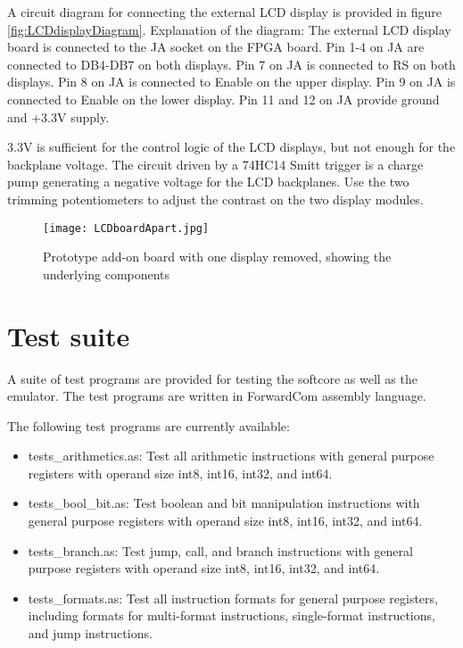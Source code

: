 \documentclass[11pt,a4paper,oneside,openright]{report}
\newcommand{\vv}{ \vspace{2mm} }   %
\begin{document}
A circuit diagram for connecting the external LCD display is provided in figure \ref{fig:LCDdisplayDiagram}. Explanation of the diagram: The external LCD display board is connected to the JA socket on the FPGA board. Pin 1-4 on JA are connected to DB4-DB7 on both displays. Pin 7 on JA is connected to RS on both displays. Pin 8 on JA is connected to Enable on the upper display. Pin 9 on JA is connected to Enable on the lower display. Pin 11 and 12 on JA provide ground and +3.3V supply. 
\vv

3.3V is sufficient for the control logic of the LCD displays, but not enough for the backplane voltage. The circuit driven by a 74HC14 Smitt trigger is a charge pump generating a negative voltage for the LCD backplanes. Use the two trimming potentiometers to adjust the contrast on the two display modules.
\vv

\begin{center}
\begin{figure}[ht]
\texttt{[image: LCDboardApart.jpg]}
\caption{Prototype add-on board with one display removed, showing the underlying components}
\label{fig:AddOnBoardDisassembled}
\end{figure}
\end{center}
\vv


\chapter{Test suite}
A suite of test programs are provided for testing the softcore as well as the emulator. The test programs are written in ForwardCom assembly language.
\vv

The following test programs are currently available:
\begin{itemize}
\item tests\_arithmetics.as: Test all arithmetic instructions with general purpose registers with operand size int8, int16, int32, and int64.
\item tests\_bool\_bit.as: Test boolean and bit manipulation instructions with general purpose registers with operand size int8, int16, int32, and int64.
\item tests\_branch.as: Test jump, call, and branch instructions with general purpose registers with operand size int8, int16, int32, and int64.
\item tests\_formats.as: Test all instruction formats for general purpose registers, including formats for multi-format instructions, single-format instructions, and jump instructions.
\end{itemize}
\vv
\end{document}
